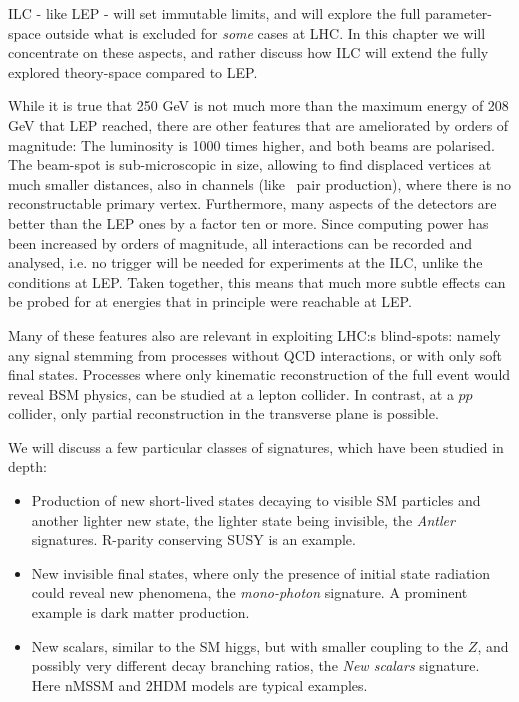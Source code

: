 ILC - like LEP - will set immutable limits, and will explore
the full parameter-space outside what is excluded for {\it some}
cases at LHC. In this chapter we will concentrate on these aspects, and rather
discuss how ILC will extend the fully explored theory-space
compared to LEP.

While it is true that 250 GeV is not much more than the maximum 
energy of 208 GeV that LEP reached,
there are other features that are
ameliorated by orders of magnitude: 
The luminosity is 1000 times higher,
and both beams are  polarised.
The beam-spot is sub-microscopic in size, allowing to find 
displaced vertices at much smaller distances, also in channels 
(like \stau~pair production),
where there is no reconstructable primary vertex.
Furthermore, 
many aspects of the detectors are better than the LEP ones by a 
factor ten or more.
Since computing power has been increased by orders of magnitude,
all interactions can be recorded and analysed, 
i.e.
no trigger will be needed for experiments at the ILC, 
unlike the conditions at LEP.
Taken together, this means that much more subtle effects
can be probed for at energies that in principle were reachable at LEP.

Many of these features also are relevant in exploiting LHC:s blind-spots: 
namely any signal stemming from processes without QCD interactions,
or with only soft final states.
Processes where only kinematic reconstruction of the full event
would reveal BSM physics,
can be studied at a lepton collider. 
In contrast, 
at a $pp$ collider, only partial reconstruction 
in the transverse plane is possible.

We will discuss a few particular classes of signatures,
which have been studied in depth:
\begin{itemize}
\item Production of new short-lived states decaying to visible
  SM particles and another lighter new state, the lighter
  state being invisible, the {\it Antler} signatures.
  R-parity conserving SUSY is an example.
\item New invisible final states, where only the presence
  of initial state radiation could reveal new phenomena,
  the {\it mono-photon} signature.
  A prominent example is dark matter production.
\item New scalars, similar to the SM higgs, but with smaller
  coupling to the $Z$, and possibly very different decay
  branching ratios, the {\it New scalars} signature.
  Here nMSSM and 2HDM models are typical examples.
\end{itemize}



